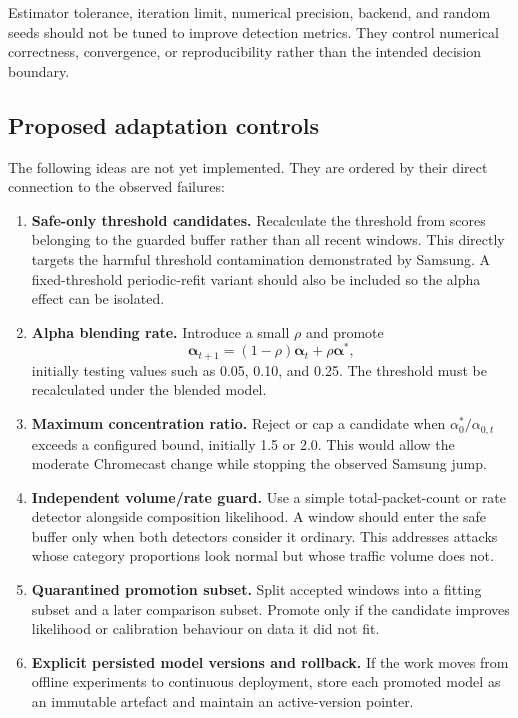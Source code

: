 \documentclass[11pt,a4paper]{article}
\begin{document}
Estimator tolerance, iteration limit, numerical precision, backend, and random
seeds should not be tuned to improve detection metrics. They control numerical
correctness, convergence, or reproducibility rather than the intended decision
boundary.

\subsection{Proposed adaptation controls}

The following ideas are not yet implemented. They are ordered by their direct
connection to the observed failures:

\begin{enumerate}
  \item \textbf{Safe-only threshold candidates.} Recalculate the threshold from
  scores belonging to the guarded buffer rather than all recent windows. This
  directly targets the harmful threshold contamination demonstrated by
  Samsung. A fixed-threshold periodic-refit variant should also be included so
  the alpha effect can be isolated.
  \item \textbf{Alpha blending rate.} Introduce a small $\rho$ and promote
  \[
  \boldsymbol{\alpha}_{t+1}
  =(1-\rho)\boldsymbol{\alpha}_t+\rho\boldsymbol{\alpha}^{*},
  \]
  initially testing values such as 0.05, 0.10, and 0.25. The threshold must be
  recalculated under the blended model.
  \item \textbf{Maximum concentration ratio.} Reject or cap a candidate when
  $\alpha_0^{*}/\alpha_{0,t}$ exceeds a configured bound, initially 1.5 or 2.0.
  This would allow the moderate Chromecast change while stopping the observed
  Samsung jump.
  \item \textbf{Independent volume/rate guard.} Use a simple total-packet-count
  or rate detector alongside composition likelihood. A window should enter the
  safe buffer only when both detectors consider it ordinary. This addresses
  attacks whose category proportions look normal but whose traffic volume does
  not.
  \item \textbf{Quarantined promotion subset.} Split accepted windows into a
  fitting subset and a later comparison subset. Promote only if the candidate
  improves likelihood or calibration behaviour on data it did not fit.
  \item \textbf{Explicit persisted model versions and rollback.} If the work
  moves from offline experiments to continuous deployment, store each promoted
  model as an immutable artefact and maintain an active-version pointer.
\end{enumerate}
\end{document}
